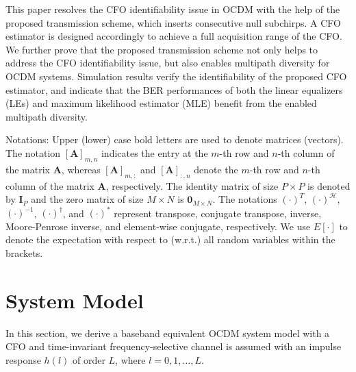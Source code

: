 \documentclass[journal]{IEEEtran}
\begin{document}
This paper resolves the CFO identifiability issue in OCDM %
with the help of the proposed transmission scheme, which inserts consecutive null subchirps. A CFO estimator is designed accordingly to achieve a full acquisition range of the CFO. 
We further prove that the proposed transmission scheme not only helps to address the CFO identifiability issue, but also enables multipath diversity for OCDM systems. Simulation results verify the identifiability of the proposed CFO estimator, and indicate that the BER performances of both the linear equalizers (LEs) and maximum likelihood estimator (MLE) benefit from the enabled multipath diversity.






Notations: Upper (lower) case bold letters are used to denote matrices (vectors). The notation \([\mathbf{A}]_{m,n}\) indicates the entry at the \(m\)-th row and \(n\)-th column of the matrix \(\mathbf{A}\), whereas \([\mathbf{A}]_{m,:}\) and \([\mathbf{A}]_{:,n}\) denote the $m$-th row and $n$-th column of the matrix \(\mathbf{A}\), respectively. The identity matrix of size \(P\times P\) is denoted by \(\mathbf{I}_P\) and the zero matrix of size \(M\times N\) is \(\mathbf{0}_{M \times N}\). The notations \((\cdot)^{T}\), \((\cdot)^\mathcal{H}\), \((\cdot)^{-1}\), \((\cdot)^\dagger\), and \((\cdot)^\ast\) represent transpose, conjugate transpose, inverse, Moore-Penrose inverse, and element-wise conjugate, respectively. We use \(E[\cdot]\) to denote the expectation with respect to (w.r.t.) all random variables within the brackets. %


\section{System Model}
In this section, we derive a baseband equivalent OCDM system model with a CFO and time-invariant frequency-selective channel is assumed with an impulse response \(h(l)\) of order \(L\), where \(l = 0,1,\dots,L\).
\end{document}

